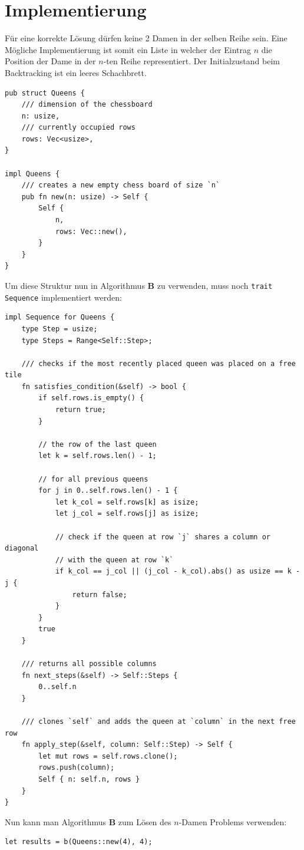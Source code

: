 \section{Implementierung}
Für eine korrekte Lösung dürfen keine 2 Damen in der selben Reihe sein. Eine Mögliche Implementierung ist somit ein Liste in welcher der Eintrag
$n$ die Position der Dame in der $n$-ten Reihe representiert. Der Initialzustand beim Backtracking ist ein leeres Schachbrett.
\begin{verbatim}
pub struct Queens {
    /// dimension of the chessboard
    n: usize,
    /// currently occupied rows
    rows: Vec<usize>,
}
  
impl Queens {
    /// creates a new empty chess board of size `n`
    pub fn new(n: usize) -> Self {
        Self {
            n,
            rows: Vec::new(),
        }
    }
}
\end{verbatim}
Um diese Struktur nun in Algorithmus \textbf{B} zu verwenden, muss noch \texttt{trait Sequence} implementiert werden:
\begin{verbatim}
impl Sequence for Queens {
    type Step = usize;
    type Steps = Range<Self::Step>;

    /// checks if the most recently placed queen was placed on a free tile
    fn satisfies_condition(&self) -> bool {
        if self.rows.is_empty() {
            return true;
        }

        // the row of the last queen
        let k = self.rows.len() - 1;

        // for all previous queens
        for j in 0..self.rows.len() - 1 {
            let k_col = self.rows[k] as isize;
            let j_col = self.rows[j] as isize;

            // check if the queen at row `j` shares a column or diagonal
            // with the queen at row `k`
            if k_col == j_col || (j_col - k_col).abs() as usize == k - j {
                return false;
            }
        }
        true
    }

    /// returns all possible columns
    fn next_steps(&self) -> Self::Steps {
        0..self.n
    }

    /// clones `self` and adds the queen at `column` in the next free row
    fn apply_step(&self, column: Self::Step) -> Self {
        let mut rows = self.rows.clone();
        rows.push(column);
        Self { n: self.n, rows }
    }
}
\end{verbatim}
Nun kann man Algorithmus \textbf{B} zum Lösen des $n$-Damen Problems verwenden:
\begin{verbatim}
let results = b(Queens::new(4), 4);
\end{verbatim}
